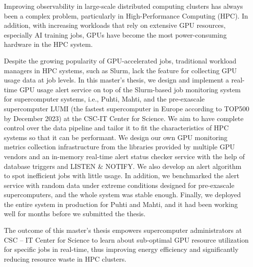 Improving observability in large-scale distributed computing clusters has always been a complex problem, particularly in High-Performance Computing (HPC). In addition, with increasing workloads that rely on extensive GPU resources, especially AI training jobs, GPUs have become the most power-consuming hardware in the HPC system.

Despite the growing popularity of GPU-accelerated jobs, traditional workload managers in HPC systems, such as Slurm, lack the feature for collecting GPU usage data at job levels. In this master's thesis, we design and implement a real-time GPU usage alert service on top of the Slurm-based job monitoring system for supercomputer systems, i.e., Puhti, Mahti, and the pre-exascale supercomputer LUMI (the fastest supercomputer in Europe according to TOP500 by December 2023) at the CSC-IT Center for Science. We aim to have complete control over the data pipeline and tailor it to fit the characteristics of HPC systems so that it can be performant. We design our own GPU monitoring metrics collection infrastructure from the libraries provided by multiple GPU vendors and an in-memory real-time alert status checker service with the help of database triggers and LISTEN \& NOTIFY. We also develop an alert algorithm to spot inefficient jobs with little usage. In addition, we benchmarked the alert service with random data under extreme conditions designed for pre-exascale supercomputers, and the whole system was stable enough. Finally, we deployed the entire system in production for Puhti and Mahti, and it had been working well for months before we submitted the thesis.

The outcome of this master's thesis empowers supercomputer administrators at CSC -- IT Center for Science to learn about sub-optimal GPU resource utilization for specific jobs in real-time, thus improving energy efficiency and significantly reducing resource waste in HPC clusters.
